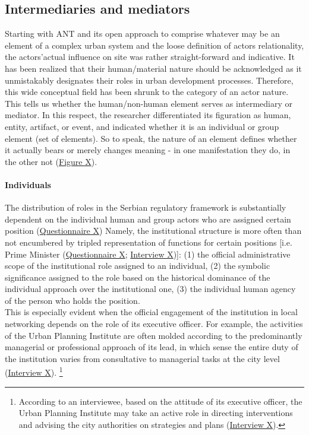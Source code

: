 \documentclass[11pt]{report}
\begin{document}
\subsection{Intermediaries and mediators}

Starting with ANT and its open approach to comprise whatever may be an element of a complex urban system and the loose definition of actors relationality, the actors’actual influence on site was rather straight-forward and indicative. It has been realized that their human/material nature should be acknowledged as it unmistakably designates their roles in urban development processes. Therefore, this wide conceptual field has been shrunk to the category of an actor nature. This tells us whether the human/non-human element serves as intermediary or mediator. In this respect, the researcher differentiated its figuration as human, entity, artifact, or event, and indicated whether it is an individual or group element (set of elements). So to speak, the nature of an element defines whether it actually bears or merely changes meaning - in one manifestation they do, in the other not (\href{Figure 5 ANT paper}{Figure X}).

\paragraph{Individuals}
The distribution of roles in the Serbian regulatory framework is substantially dependent on the individual human and group actors who are assigned certain position (\href{Questionnaire Experts Post-socialist}{Questionnaire X})
Namely, the institutional structure is more often than not encumbered by tripled representation of functions for certain positions [i.e. Prime Minister (\href{Questionnaire Experts Post-socialist}{Questionnaire X}; \href{Interview}{Interview X})]:
(1) the official administrative scope of the institutional role assigned to an individual,
(2) the symbolic significance assigned to the role based on the historical dominance of the individual approach over the institutional one,
(3) the individual human agency of the person who holds the position.
\\

This is especially evident when the official engagement of the institution in local networking depends on the role of its executive officer. For example, the activities of the Urban Planning Institute are often molded according to the predominantly managerial or professional approach of its lead, in which sense the entire duty of the institution varies from consultative to managerial tasks at the city level (\href{Annex}{Interview X}).
\footnote{
According to an interviewee, based on the attitude of its executive officer, the Urban Planning Institute may take an active role in directing interventions and advising the city authorities on strategies and plans (\href{InterviewX}{Interview X}).}
\\
\end{document}

